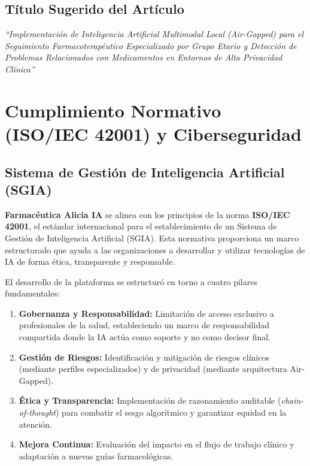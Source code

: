 \documentclass[12pt,a4paper]{article}
\begin{document}
\subsection{Título Sugerido del Artículo}

\begin{infobox}
  \centering\itshape
  ``Implementación de Inteligencia Artificial Multimodal Local (Air-Gapped) para el
  Seguimiento Farmacoterapéutico Especializado por Grupo Etario y Detección de Problemas
  Relacionados con Medicamentos en Entornos de Alta Privacidad Clínica''
\end{infobox}

\newpage

\section{Cumplimiento Normativo (ISO/IEC 42001) y Ciberseguridad}

\subsection{Sistema de Gestión de Inteligencia Artificial (SGIA)}

\textbf{Farmacéutica Alicia IA} se alinea con los principios de la norma \textbf{ISO/IEC 42001}, el estándar internacional para el establecimiento de un Sistema de Gestión de Inteligencia Artificial (SGIA). Esta normativa proporciona un marco estructurado que ayuda a las organizaciones a desarrollar y utilizar tecnologías de IA de forma ética, transparente y responsable.

El desarrollo de la plataforma se estructuró en torno a cuatro pilares fundamentales:
\begin{enumerate}
  \item \textbf{Gobernanza y Responsabilidad:} Limitación de acceso exclusivo a profesionales de la salud, estableciendo un marco de responsabilidad compartida donde la IA actúa como soporte y no como decisor final.
  \item \textbf{Gestión de Riesgos:} Identificación y mitigación de riesgos clínicos (mediante perfiles especializados) y de privacidad (mediante arquitectura Air-Gapped).
  \item \textbf{Ética y Transparencia:} Implementación de razonamiento auditable (\textit{chain-of-thought}) para combatir el sesgo algorítmico y garantizar equidad en la atención.
  \item \textbf{Mejora Continua:} Evaluación del impacto en el flujo de trabajo clínico y adaptación a nuevas guías farmacológicas.
\end{enumerate}
\end{document}
